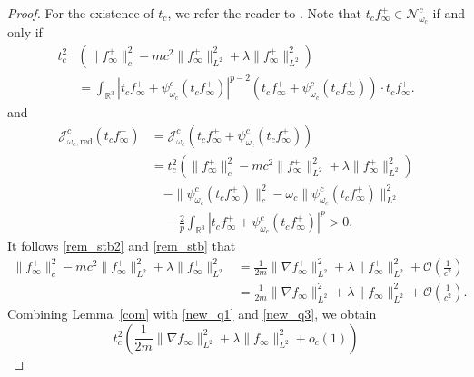 \documentclass{amsart}
\theoremstyle{plain}
\theoremstyle{definition}
\theoremstyle{remark}
\numberwithin{equation}{section} \numberwithin{figure}{section}
\begin{document}
\begin{proof}
  For the existence of \( t_c \), we refer the reader to \cite[Lemma 3.7]{WJC}. Note that \( t_c f_\infty^+ \in \mathcal{N}^c_{\omega_c} \) if and only if
  \begin{equation}\label{as_2}
      \begin{split}
          t_c^2 &\left( \|f_\infty^+\|_c^2 - mc^2 \|f_\infty^+\|_{L^2}^2 + \lambda \|f_\infty^+\|_{L^2}^2 \right) \\
          &= \int_{\mathbb{R}^3} \left| t_c f_\infty^+ + \psi_{\omega_c}^c(t_c f_\infty^+) \right|^{p-2}
              \left( t_c f_\infty^+ + \psi_{\omega_c}^c(t_c f_\infty^+) \right) \cdot t_c f_\infty^+.
      \end{split}
  \end{equation}
  and
  \begin{equation}\label{new_q1}
      \begin{split}
          \mathcal{J}^c_{\omega_c,\text{red}}(t_c f_\infty^+)
          &= \mathcal{J}^c_{\omega_c} \left( t_c f_\infty^+ + \psi_{\omega_c}^c(t_c f_\infty^+) \right) \\
          &= t_c^2 \left( \|f_\infty^+\|_c^2 - mc^2 \|f_\infty^+\|_{L^2}^2 + \lambda \|f_\infty^+\|_{L^2}^2 \right) \\
          &\quad - \| \psi_{\omega_c}^c(t_c f_\infty^+) \|_c^2 - \omega_c \| \psi_{\omega_c}^c(t_c f_\infty^+) \|_{L^2}^2 \\
          &\quad - \frac{2}{p} \int_{\mathbb{R}^3} \left| t_c f_\infty^+ + \psi_{\omega_c}^c(t_c f_\infty^+) \right|^p > 0.
      \end{split}
  \end{equation}
  It follows \eqref{rem_stb2} and \eqref{rem_stb} that
  \begin{equation}\label{new_q3}
  \begin{split}
         \| f_\infty^+ \|_c^2 - mc^2 \| f_\infty^+ \|_{L^2}^2+\lambda \|f_\infty^+\|_{L^2}^2& = \frac{1}{2m} \| \nabla f_\infty^+ \|_{L^2}^2+ \lambda \|f_\infty^+\|_{L^2}^2 + \mathcal{O}\left(\frac{1}{c^2}\right)\\
         &=\frac{1}{2m} \| \nabla f_\infty \|_{L^2}^2 +\lambda \|f_\infty\|_{L^2}^2+ \mathcal{O}\left(\frac{1}{c^2}\right).
  \end{split}
  \end{equation}
  Combining Lemma~\ref{com} with \eqref{new_q1} and \eqref{new_q3}, we obtain
  \begin{equation}\label{new_q4}
      t_c^2 \left( \frac{1}{2m} \| \nabla f_\infty \|_{L^2}^2 + \lambda \| f_\infty \|_{L^2}^2 + o_c(1) \right)

\end{equation}
\end{proof}
\end{document}
